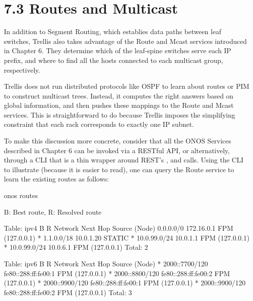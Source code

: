 \documentclass[letterpaper,11pt,english]{sphinxmanual}
\begin{document}
\section{7.3 Routes and Multicast}
\label{\detokenize{trellis:routes-and-multicast}}
In addition to Segment Routing, which establies data paths between
leaf switches, Trellis also takes advantage of the Route and Mcast
services introduced in Chapter 6. They determine which of the
leaf-spine switches serve each IP prefix, and where to find all the
hosts connected to each multicast group, respectively.

Trellis does not run distributed protocols like OSPF to learn about
routes or PIM to construct multicast trees.  Instead, it computes the
right answers based on global information, and then pushes these
mappings to the Route and Mcast services. This is straightforward to
do because Trellis imposes the simplifying constraint that each rack
corresponds to exactly one IP subnet.

To make this discussion more concrete, consider that all the ONOS
Services described in Chapter 6 can be invoked via a RESTful API, or
alternatively, through a CLI that is a thin wrapper around REST’s
,  and  calls.  Using the CLI to illustrate
(because it is easier to read), one can query the Route service to
learn the existing routes as follows:

\begin{sphinxVerbatim}[commandchars=\\\{\}]
onos\PYGZgt{} routes

B: Best route, R: Resolved route

Table: ipv4
B R  Network            Next Hop        Source (Node)
     0.0.0.0/0          172.16.0.1      FPM (127.0.0.1)
\PYGZgt{} *  1.1.0.0/18         10.0.1.20       STATIC
\PYGZgt{} *  10.0.99.0/24       10.0.1.1        FPM (127.0.0.1)
  *  10.0.99.0/24       10.0.6.1        FPM (127.0.0.1)
   Total: 2

Table: ipv6
B R  Network                                     Next Hop                                Source (Node)
\PYGZgt{} *  2000::7700/120                              fe80::288:ff:fe00:1                     FPM (127.0.0.1)
\PYGZgt{} *  2000::8800/120                              fe80::288:ff:fe00:2                     FPM (127.0.0.1)
\PYGZgt{} *  2000::9900/120                              fe80::288:ff:fe00:1                     FPM (127.0.0.1)
  *  2000::9900/120                              fe80::288:ff:fe00:2                     FPM (127.0.0.1)
   Total: 3
\end{sphinxVerbatim}
\end{document}
